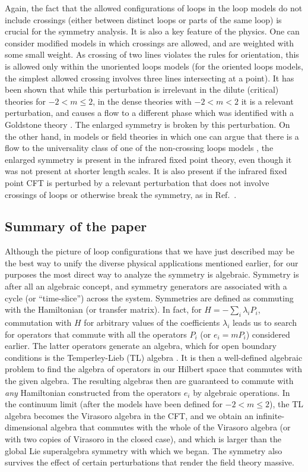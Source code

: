 \documentclass[twocolumn,floats,pra]{revtex4}
\begin{document}
Again, the fact that the allowed configurations of loops in the
loop models do not include crossings (either between distinct
loops or parts of the same loop) is crucial for the symmetry
analysis. It is also a key feature of the physics. One can
consider modified models in which crossings are allowed, and are
weighted with some small weight. As crossing of two lines violates
the rules for orientation, this is allowed only within the
unoriented loops models (for the oriented loops models, the
simplest allowed crossing involves three lines intersecting at a
point). It has been shown \cite{jrs} that while this perturbation
is irrelevant in the dilute (critical) theories for $-2<m\leq2$,
in the dense theories with $-2<m<2$ it is a relevant perturbation,
and causes a flow to a different phase which was identified with a
Goldstone theory \cite{jrs}. The enlarged symmetry is broken by
this perturbation. On the other hand, in models or field theories
in which one can argue that there is a flow to the universality
class of one of the non-crossing loops models \cite{rs,fr}, the
enlarged symmetry is present in the infrared fixed point theory,
even though it was not present at shorter length scales. It is
also present if the infrared fixed point CFT is perturbed by a
relevant perturbation that does not involve crossings of loops or
otherwise break the symmetry, as in Ref.\ \cite{fr}.

\subsection{Summary of the paper}

Although the picture of loop configurations that we have just
described may be the best way to unify the diverse physical
applications mentioned earlier, for our purposes the most direct
way to analyze the symmetry is algebraic. Symmetry is after all an
algebraic concept, and symmetry generators are associated with a
cycle (or ``time-slice'') across the system. Symmetries are
defined as commuting with the Hamiltonian (or transfer matrix). In
fact, for $H=-\sum_i\lambda_iP_i$, commutation with $H$ for
arbitrary values of the coefficients $\lambda_i$ leads us to
search for operators that commute with all the operators $P_i$ (or
$e_i=mP_i$) considered earlier. The latter operators generate an
algebra, which for open boundary conditions is the Temperley-Lieb
(TL) algebra \cite{tl,baxter,bb,affleck3}. It is then a
well-defined algebraic problem to find the algebra of operators in
our Hilbert space that commutes with the given algebra. The
resulting algebras then are guaranteed to commute with {\em any}
Hamiltonian constructed from the operators $e_i$ by algebraic
operations. In the continuum limit (after the models have been
defined for $-2<m\leq 2$), the TL algebra becomes the Virasoro
algebra in the CFT, and we obtain an infinite-dimensional algebra
that commutes with the whole of the Virasoro algebra (or with two
copies of Virasoro in the closed case), and which is larger than
the global Lie superalgebra symmetry with which we began. The
symmetry also survives the effect of certain perturbations that
render the field theory massive.
\end{document}
